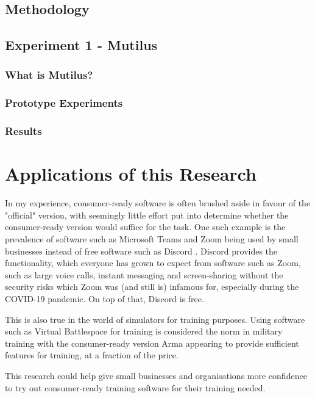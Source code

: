 \documentclass[12pt]{article}
\begin{document}
\subsection{Methodology}

\subsection{Experiment 1 - Mutilus}

\subsubsection{What is Mutilus?}

\subsubsection{Prototype Experiments}



\subsubsection{Results}

\section{Applications of this Research}

In my experience, consumer-ready software is often brushed aside in favour of the "official" version, with seemingly little effort put into determine whether the consumer-ready version would suffice for the task. One such example is the prevalence of software such as Microsoft Teams \cite{MicrosoftTeams} and Zoom \cite{Zoom} being used by small businesses instead of free software such as Discord \cite{Discord}. Discord provides the functionality, which everyone has grown to expect from software such as Zoom, such as large voice calls, instant messaging and screen-sharing without the security risks which Zoom was (and still is) infamous for, especially during the COVID-19 pandemic. On top of that, Discord is free. 

This is also true in the world of simulators for training purposes. Using software such as Virtual Battlespace for training is considered the norm in military training with the consumer-ready version Arma appearing to provide sufficient features for training, at a fraction of the price. 

This research could help give small businesses and organisations more confidence to try out consumer-ready training software for their training needed. 
\end{document}
